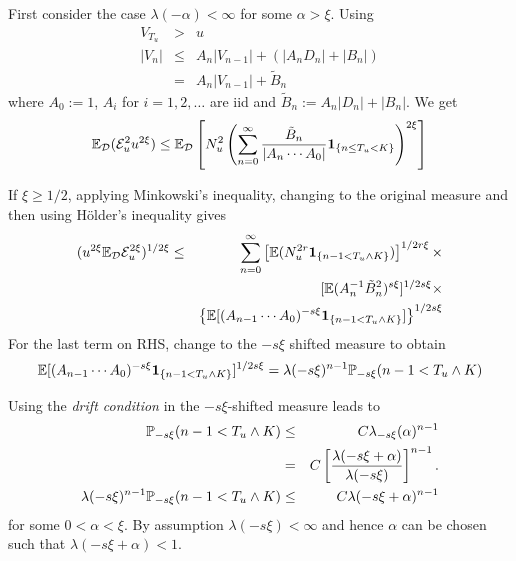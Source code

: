 \documentclass{beamer}
\begin{document}
\begin{frame}
  First consider the case $\lambda(-\alpha) < \infty$ for some $\alpha
  > \xi$. Using
  \begin{eqnarray*}
    V_{T_u} &>& u \\
    |V_n| &\leq& A_n|V_{n-1}| + (|A_n D_n| + |B_n|) \\
    &=& A_n |V_{n-1}| + \tilde B_n
  \end{eqnarray*}
  where $A_{0} := 1$, $A_i$ for $i =1, 2, \dots$ are iid and $\tilde B_n :=
  A_n |D_n| + |B_n|$. We get
  \[
  \E_{\mathcal D}(\mathcal E_u^2 u^{2\xi}) \leq
  \E_{\mathcal D} \left[
    N_u^2
    \left(
    \sum_{n=0}^{\infty} {
      \tilde B_n
      \over
      |A_n \cdots A_0|
    }
    \1{n \leq T_u < K}
    \right)^{2\xi}
    \right]
  \]
\end{frame}

\begin{frame}
  If $\xi \geq 1/2$, applying Minkowski's inequality, changing to
  the original measure and then using H\"older's inequality gives
  \begin{eqnarray*}
    (u^{2\xi} \E_{\mathcal D} \mathcal{E}^{2\xi}_u)^{1/2\xi} &\leq&
    \sum_{n=0}^\infty
    \left[\E (N_u^{2r} \1{n-1 < T_u \wedge K})\right]^{1/2r\xi} \times \\
    && [\E (A_n^{-1} \tilde B_n^2)^{s\xi}]^{1/2s\xi} \times \\
    && \left\{\E[
    (A_{n-1} \cdots A_0)^{-s\xi}
    \1{n-1 < T_u \wedge K}
    ]\right\}^{1/2s\xi}
  \end{eqnarray*}
  For the last term on RHS, change to the $-s\xi$ shifted measure to
  obtain
  \[
  \E[
    (A_{n-1} \cdots A_0)^{-s\xi}
    \1{n-1 < T_u \wedge K}
    ]^{1/2s\xi} = \lambda(-s\xi)^{n-1} \P_{-s\xi}(n-1 < T_u \wedge K)
  \]
\end{frame}

\begin{frame}
  Using the {\it drift condition} in the $-s\xi$-shifted measure leads to
  \begin{eqnarray*}
    \P_{-s\xi}(n-1 < T_u \wedge K) &\leq& C
    \lambda_{-s\xi}(\alpha)^{n-1} \\
    &=& C \left[
      {
      \lambda(-s\xi + \alpha)
      \over
      \lambda(-s\xi)
    }
    \right]^{n-1}. \\
    \lambda(-s\xi)^{n-1} \P_{-s\xi}(n-1 < T_u \wedge K) &\leq& C
    \lambda(-s\xi + \alpha)^{n-1}
  \end{eqnarray*}
  for some $0 < \alpha < \xi$. By assumption $\lambda(-s\xi) < \infty$
  and hence $\alpha$ can be chosen such that $\lambda(-s\xi + \alpha)
  < 1$.
\end{frame}
\end{document}
